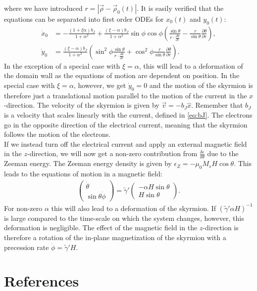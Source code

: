 \documentclass[1p]{elsarticle}		%
\numberwithin{equation}{section}
\begin{document}
where we have introduced $r = |\vec{\rho}-\vec{\rho}_0(t)|$. It is easily verified that the equations can be separated into first order ODEs for $x_0(t)$ and $y_0(t)$:
\begin{align}
\dot{x}_0 &= - \frac{(1+\xi\alpha)b_J}{1+\alpha^2} + \frac{(\xi-\alpha)b_J}{1+\alpha^2}\sin\phi\cos\phi \left( \frac{\sin\theta}{r \cdot \frac{\partial \theta}{\partial r}} - \frac{r}{\sin\theta}\frac{\partial\theta}{\partial r}\right), \\
\dot{y}_0 &= \frac{(\xi-\alpha)b_J}{1+\alpha^2}\left(\sin^2\phi \frac{\sin\theta}{r \cdot \frac{\partial \theta}{\partial r}} +\cos^2\phi \frac{r}{\sin\theta}\frac{\partial\theta}{\partial r}\right).
\end{align}
In the exception of a special case with $\xi = \alpha$, this will lead to a deformation of the domain wall as the equations of motion are dependent on position. In the special case with $\xi = \alpha$, however, we get $\dot{y}_0 = 0$ and the motion of the skyrmion is therefore just a translational motion parallel to the motion of the current in the $x$-direction. The velocity of the skyrmion is given by $\vec{v} = -b_J\hat{x}$. Remember that $b_J$ is a velocity that scales linearly with the current, defined in \eqref{eq:bJ}. The electrons go in the opposite direction of the electrical current, meaning that the skyrmion follows the motion of the electrons.\\
If we instead turn off the electrical current and apply an external magnetic field in the $z$-direction, we will now get a non-zero contribution from $\frac{\delta\epsilon}{\delta\theta}$ due to the Zeeman energy. The Zeeman energy density is given by $\epsilon_Z = -\mu_0M_sH\cos\theta$. This leads to the equations of motion in a magnetic field:
\begin{align}
\nonumber \begin{pmatrix}
\dot{\theta} \\ \sin\theta\dot{\phi}
\end{pmatrix} =
\tilde{\gamma}'
\begin{pmatrix}
-\alpha H\sin\theta \\ H\sin\theta
\end{pmatrix}.
\label{eq:LLG_skyrmion_Hz}
\end{align}
For non-zero $\alpha$ this will also lead to a deformation of the skyrmion. If $(\tilde{\gamma}'\alpha H)^{-1}$ is large compared to the time-scale on which the system changes, however, this deformation is negligible. The effect of the magnetic field in the $z$-direction is therefore a rotation of the in-plane magnetization of the skyrmion with a precession rate $\dot{\phi} = \tilde{\gamma}'H$.
\section{References}


\end{document}
